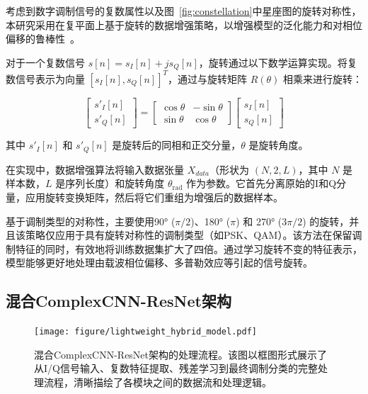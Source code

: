 \documentclass{article}
\begin{document}
考虑到数字调制信号的复数属性以及图~\ref{fig:constellation}中星座图的旋转对称性，本研究采用在复平面上基于旋转的数据增强策略，以增强模型的泛化能力和对相位偏移的鲁棒性~\cite{guo2024ulcnn}。

对于一个复数信号 \(s[n] = s_I[n] + j s_Q[n]\)，旋转通过以下数学运算实现。将复数信号表示为向量 \([s_I[n], s_Q[n]]^T\)，通过与旋转矩阵 \(R(\theta)\) 相乘来进行旋转：

\begin{equation}
\begin{bmatrix} s'_I[n] \\ s'_Q[n] \end{bmatrix} = \begin{bmatrix} \cos\theta & -\sin\theta \\ \sin\theta & \cos\theta \end{bmatrix} \begin{bmatrix} s_I[n] \\ s_Q[n] \end{bmatrix}
\end{equation}

其中 \(s'_I[n]\) 和 \(s'_Q[n]\) 是旋转后的同相和正交分量，\(\theta\) 是旋转角度。



在实现中，数据增强算法将输入数据张量 \(X_{data}\)（形状为 \((N, 2, L)\)，其中 \(N\) 是样本数，\(L\) 是序列长度）和旋转角度 \(\theta_{\text{rad}}\) 作为参数。它首先分离原始的I和Q分量，应用旋转变换矩阵，然后将它们重组为增强后的数据样本。

基于调制类型的对称性，主要使用90° (\(\pi/2\))、180° (\(\pi\)) 和 270° (\(3\pi/2\)) 的旋转，并且该策略仅应用于具有旋转对称性的调制类型（如PSK、QAM）。该方法在保留调制特征的同时，有效地将训练数据集扩大了四倍。通过学习旋转不变的特征表示，模型能够更好地处理由载波相位偏移、多普勒效应等引起的信号旋转。


\subsection{混合ComplexCNN-ResNet架构}

\begin{figure}[htbp]
\centering
\texttt{[image: figure/lightweight\_hybrid\_model.pdf]}
\caption{混合ComplexCNN-ResNet架构的处理流程。该图以框图形式展示了从I/Q信号输入、复数特征提取、残差学习到最终调制分类的完整处理流程，清晰描绘了各模块之间的数据流和处理逻辑。}
\label{fig:lightweight_hybrid_model_flow}
\end{figure}
\end{document}
